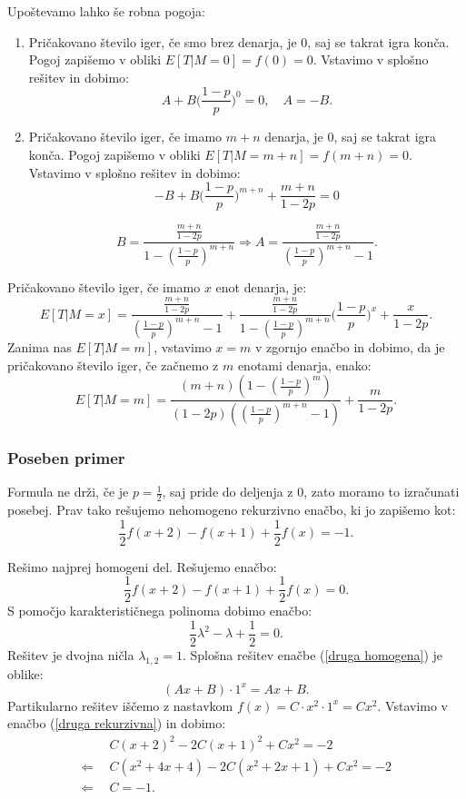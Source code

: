 \documentclass[12pt, a4paper]{article}
\begin{document}
Upoštevamo lahko še robna pogoja:
\begin{enumerate}
\item Pričakovano število iger, če smo brez denarja, je 0, saj se takrat igra konča. Pogoj zapišemo v obliki $E[T|M= 0] = f(0) = 0$. Vstavimo v splošno rešitev in dobimo:
$$A + B\bigg( \frac{1-p}{p} \bigg )^0 = 0, \quad A = -B.$$
\item Pričakovano število iger, če imamo $m+n$ denarja, je 0, saj se takrat igra konča. Pogoj zapišemo v obliki $E[T|M= m+n] = f(m+n) = 0$. Vstavimo v splošno rešitev in dobimo:
$$-B + B\bigg( \frac{1-p}{p} \bigg )^{m+n}+\frac{m+n}{1-2p}=0$$

$$B = \frac{\frac{m+n}{1-2p}}{1- \left(\frac{1-p}{p}\right)^{m+n}} \Rightarrow A = \frac{\frac{m+n}{1-2p}}{\left(\frac{1-p}{p}\right)^{m+n}-1}.$$
\end{enumerate}

Pričakovano število iger, če imamo $x$ enot denarja, je: $$E[ T | M = x]= \frac{\frac{m+n}{1-2p}}{\left(\frac{1-p}{p}\right)^{m+n}-1} + \frac{\frac{m+n}{1-2p}}{1- \left(\frac{1-p}{p}\right)^{m+n}}\bigg( \frac{1-p}{p} \bigg )^x+\frac{x}{1-2p}.$$
 Zanima nas $E[T|M=m]$, vstavimo $x=m$ v zgornjo enačbo in dobimo, da je pričakovano število iger, če začnemo z $m$ enotami denarja, enako: $$E[T|M=m]=\frac{(m+n) \left(1-\left(\frac{1-p}{p}\right)^m\right)}{(1-2 p)
   \left(\left(\frac{1-p}{p}\right)^{m+n}-1\right)}+\frac{m}{1-2 p}.$$

\subsubsection{Poseben primer}
\label{Poseben primer za 1/2}
Formula ne drži, če je $p = \frac{1}{2}$, saj pride do deljenja z 0, zato moramo to izračunati posebej. Prav tako rešujemo nehomogeno rekurzivno enačbo, ki jo zapišemo kot: 
\begin{equation}
\label{druga rekurzivna}
\frac{1}{2}f(x+2)-f(x+1)+\frac{1}{2}f(x)=-1.
\end{equation}

Rešimo najprej homogeni del. Rešujemo enačbo: 
\begin{equation}
\label{druga homogena}
\frac{1}{2}f(x+2)-f(x+1)+\frac{1}{2}f(x)=0.
\end{equation} S pomočjo karakterističnega polinoma dobimo enačbo: 
$$\frac{1}{2}\lambda^2-\lambda+\frac{1}{2}=0.$$
Rešitev je dvojna ničla $\lambda_{1, 2}= 1$. Splošna rešitev enačbe (\ref{druga homogena}) je oblike: $$(Ax+B)\cdot 1^x=Ax+B.$$
Partikularno rešitev iščemo z nastavkom $f(x)=C\cdot x^2\cdot 1^x= Cx^2$. Vstavimo v enačbo (\ref{druga rekurzivna}) in dobimo:
\begin{equation*}
\begin{split}
 & ~~C(x+2)^2-2C(x+1)^2+Cx^2=-2\\
\Leftarrow & ~~C(x^2+4x+4)-2C(x^2+2x+1)+Cx^2=-2\\
\Leftarrow &  ~~C = -1 .\\
\end{split}
\end{equation*}
\end{document}

